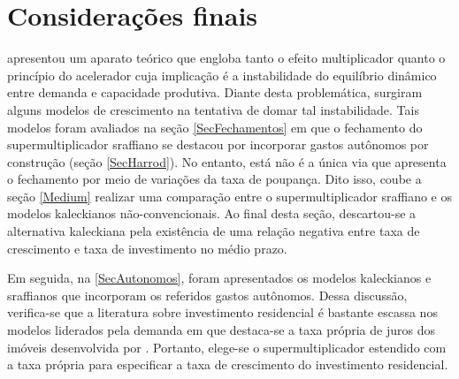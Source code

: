 \section{Considerações finais}
\label{Concl1}




\textcite{harrod_essay_1939} apresentou um aparato teórico que engloba tanto o efeito multiplicador quanto o princípio do acelerador cuja implicação é a instabilidade do equilíbrio dinâmico entre demanda e capacidade produtiva. Diante desta problemática, surgiram alguns modelos de crescimento na tentativa de domar tal instabilidade. Tais modelos foram avaliados na seção \ref{SecFechamentos} em que o fechamento do supermultiplicador sraffiano se destacou por incorporar gastos autônomos por construção (seção \ref{SecHarrod}). 
No entanto, está não é a única via que apresenta o fechamento por meio de variações da taxa de poupança.
Dito isso, coube a seção \ref{Medium} realizar uma comparação entre o supermultiplicador sraffiano e os modelos kaleckianos não-convencionais.
Ao final desta seção, descartou-se a alternativa kaleckiana pela existência de uma relação negativa entre taxa de crescimento e taxa de investimento no médio prazo.


Em seguida, na \ref{SecAutonomos},
foram apresentados os modelos kaleckianos e sraffianos que incorporam os referidos gastos autônomos.
Dessa discussão, verifica-se que a literatura sobre investimento residencial é bastante escassa nos modelos liderados pela demanda em que destaca-se a taxa própria de juros dos imóveis desenvolvida por \textcite{teixeira_crescimento_2015}.
Portanto, elege-se o supermultiplicador estendido com a taxa própria para especificar a taxa de crescimento do investimento residencial.

